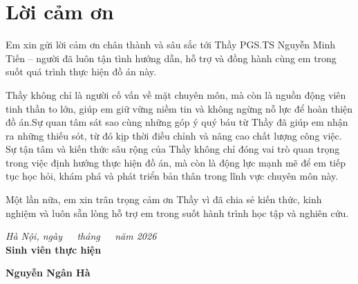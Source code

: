 \chapter*{Lời cảm ơn}

Em xin gửi lời cảm ơn chân thành và sâu sắc tới Thầy PGS.TS Nguyễn Minh Tiến – người đã luôn tận tình hướng dẫn, hỗ trợ và đồng hành cùng em trong suốt quá trình thực hiện đồ án này.

Thầy không chỉ là người cố vấn về mặt chuyên môn, mà còn là nguồn động viên tinh thần to lớn, giúp em giữ vững niềm tin và không ngừng nỗ lực để hoàn thiện đồ án.Sự quan tâm sát sao cùng những góp ý quý báu từ Thầy đã giúp em nhận ra những thiếu sót, từ đó kịp thời điều chỉnh và nâng cao chất lượng công việc. Sự tận tâm và kiến thức sâu rộng của Thầy không chỉ đóng vai trò quan trọng trong việc định hướng thực hiện đồ án, mà còn là động lực mạnh mẽ để em tiếp tục học hỏi, khám phá và phát triển bản thân trong lĩnh vực chuyên môn này.

Một lần nữa, em xin trân trọng cảm ơn Thầy vì đã chia sẻ kiến thức, kinh nghiệm và luôn sẵn lòng hỗ trợ em trong suốt hành trình học tập và nghiên cứu.

\begin{flushright}
\textit{Hà Nội, ngày\ \ \ tháng\ \ \ năm 2026} \\[1em]
\textbf{Sinh viên thực hiện}

\textbf{Nguyễn Ngân Hà}
\end{flushright}
